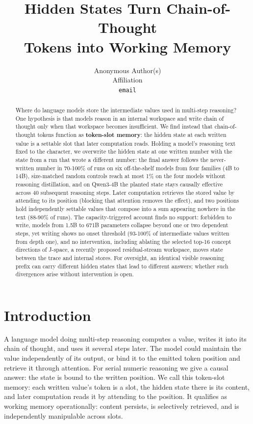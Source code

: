 \documentclass{article}
\title{Hidden States Turn Chain-of-Thought\\Tokens into Working Memory}
\author{%
  Anonymous Author(s)\\
  Affiliation\\
  \texttt{email}\\
}
\begin{document}
\maketitle

\begin{abstract}
Where do language models store the intermediate values used in multi-step reasoning? One hypothesis is that models reason in an internal workspace and write chain of thought only when that workspace becomes insufficient. We find instead that chain-of-thought tokens function as \textbf{token-slot memory}: the hidden state at each written value is a settable slot that later computation reads. Holding a model's reasoning text fixed to the character, we overwrite the hidden state at one written number with the state from a run that wrote a different number: the final answer follows the never-written number in 70-100\% of runs on six off-the-shelf models from four families (4B to 14B), size-matched random controls reach at most 1\% on the four models without reasoning distillation, and on Qwen3-4B the planted state stays causally effective across 40 subsequent reasoning steps. Later computation retrieves the stored value by attending to its position (blocking that attention removes the effect), and two positions hold independently settable values that compose into a sum appearing nowhere in the text (88-90\% of runs). The capacity-triggered account finds no support: forbidden to write, models from 1.5B to 671B parameters collapse beyond one or two dependent steps, yet writing shows no onset threshold (93-100\% of intermediate values written from depth one), and no intervention, including ablating the selected top-16 concept directions of J-space, a recently proposed residual-stream workspace, moves state between the trace and internal stores. For oversight, an identical visible reasoning prefix can carry different hidden states that lead to different answers; whether such divergences arise without intervention is open.
\end{abstract}

\section{Introduction}

A language model doing multi-step reasoning computes a value, writes it into its chain of thought, and uses it several steps later. The model could maintain the value independently of its output, or bind it to the emitted token position and retrieve it through attention. For serial numeric reasoning we give a causal answer: the state is bound to the written position. We call this token-slot memory: each written value's token is a slot, the hidden state there is its content, and later computation reads it by attending to the position. It qualifies as working memory operationally: content persists, is selectively retrieved, and is independently manipulable across slots.
\end{document}
